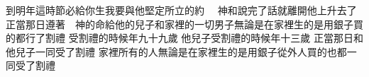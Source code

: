 到明年這時節\chientien{}必給你生\chientien 我要與他堅定所立的約\chuan\Chuan
{}　神和說完了話\chientien 就離開他上升去了\chuan 
{}正當那日\chientien{}遵著　神的命\chientien 給他的兒子和家裡的一切男子\chientien 無論是在家裡生的\chientien 是用銀子買的\chientien 都行了割禮\chuan 
{}受割禮的時候\chientien 年九十九歲\chuan 
{}他兒子受割禮的時候\chientien 年十三歲\chuan 
{}正當那日\chientien{}和他兒子\chientien 一同受了割禮\chuan 
{}家裡所有的人\chientien 無論是在家裡生的\chientien 是用銀子從外人買的\chientien 也都一同受了割禮\chuan 
